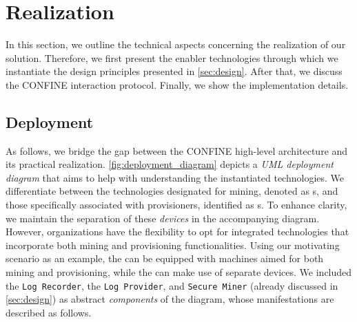 \section{Realization}
\label{sec:realization}
In this section, we outline the technical aspects concerning the realization of our solution. Therefore, we first present the enabler technologies through which we instantiate the design principles presented in \cref{sec:design}. After that, we discuss the CONFINE interaction protocol. Finally, we show the implementation details.

\subsection{Deployment}
As follows, we bridge the gap between the CONFINE high-level architecture and its practical realization. \cref{fig:deployment_diagram} depicts a \textit{UML deployment diagram} \cite{koch2002expressive} that aims to help with understanding the instantiated technologies. We differentiate between the technologies designated for mining, denoted as s, and those specifically associated with provisioners, identified as s. To enhance clarity, we maintain the separation of these \textit{devices} in the accompanying diagram. However, organizations have the flexibility to opt for integrated technologies that incorporate both mining and provisioning functionalities. Using our motivating scenario as an example, the  can be equipped with machines aimed for both mining and provisioning, while the  can make use of separate devices. We included the \texttt{Log Recorder}, the \texttt{Log Provider}, and \texttt{Secure Miner} (already discussed in \cref{sec:design}) as abstract \textit{components} of the diagram, whose manifestations are described as follows. 

